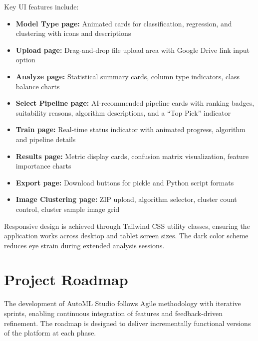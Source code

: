 \documentclass[12pt,a4paper]{report}
\begin{document}
Key UI features include:
\begin{itemize}
    \item \textbf{Model Type page:} Animated cards for classification, regression, and clustering with icons and descriptions
    \item \textbf{Upload page:} Drag-and-drop file upload area with Google Drive link input option
    \item \textbf{Analyze page:} Statistical summary cards, column type indicators, class balance charts
    \item \textbf{Select Pipeline page:} AI-recommended pipeline cards with ranking badges, suitability reasons, algorithm descriptions, and a ``Top Pick'' indicator
    \item \textbf{Train page:} Real-time status indicator with animated progress, algorithm and pipeline details
    \item \textbf{Results page:} Metric display cards, confusion matrix visualization, feature importance charts
    \item \textbf{Export page:} Download buttons for pickle and Python script formats
    \item \textbf{Image Clustering page:} ZIP upload, algorithm selector, cluster count control, cluster sample image grid
\end{itemize}

Responsive design is achieved through Tailwind CSS utility classes, ensuring the application works across desktop and tablet screen sizes. The dark color scheme reduces eye strain during extended analysis sessions.

\setcounter{chapter}{5}
\clearpage
\thispagestyle{empty}

\noindent
{}

\clearpage
{}
\setcounter{section}{0}
\section{Project Roadmap}

The development of AutoML Studio follows Agile methodology with iterative sprints, enabling continuous integration of features and feedback-driven refinement. The roadmap is designed to deliver incrementally functional versions of the platform at each phase.
\end{document}
